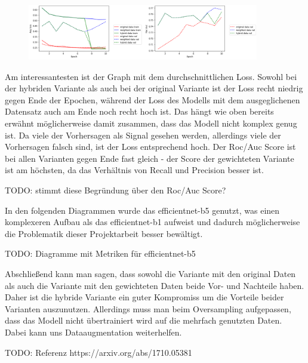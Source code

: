 \documentclass[11pt, a4paper]{article}
\begin{document}
\begin{figure}[h]
\centering
\includegraphics[width=0.9\textwidth]{metrics-avgloss-rocauc.png}
\end{figure}
Am interessantesten ist der Graph mit dem durchschnittlichen Loss. Sowohl bei der hybriden Variante als auch bei der original Variante ist der Loss recht niedrig gegen Ende der Epochen, während der Loss des Modells mit dem ausgeglichenen Datensatz auch am Ende noch recht hoch ist. Das hängt wie oben bereits erwähnt möglicherweise damit zusammen, dass das Modell nicht komplex genug ist. Da viele der Vorhersagen als Signal gesehen werden, allerdings viele der Vorhersagen falsch sind, ist der Loss entsprechend hoch. Der Roc/Auc Score ist bei allen Varianten gegen Ende fast gleich - der Score der gewichteten Variante ist am höchsten, da das Verhältnis von Recall und Precision besser ist.

TODO: stimmt diese Begründung über den Roc/Auc Score?

In den folgenden Diagrammen wurde das efficientnet-b5 genutzt, was einen komplexeren Aufbau als das efficientnet-b1 aufweist und dadurch möglicherweise die Problematik dieser Projektarbeit besser bewältigt.

TODO: Diagramme mit Metriken für efficientnet-b5

Abschließend kann man sagen, dass sowohl die Variante mit den original Daten als auch die Variante mit den gewichteten Daten beide Vor- und Nachteile haben. Daher ist die hybride Variante ein guter Kompromiss um die Vorteile beider Varianten auszunutzen. Allerdings muss man beim Oversampling aufgepassen, dass das Modell nicht übertrainiert wird auf die mehrfach genutzten Daten. Dabei kann uns Dataaugmentation weiterhelfen.

TODO: Referenz https://arxiv.org/abs/1710.05381
\end{document}
